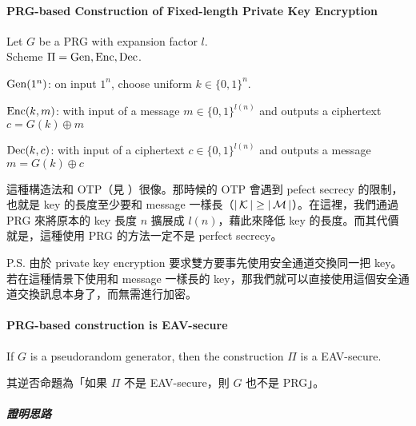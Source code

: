 \paragraph{PRG-based Construction of Fixed-length Private Key Encryption}

Let \(G\) be a PRG with expansion factor \(l\). \\
Scheme \(\Pi = \operatorname{Gen}, \operatorname{Enc}, \operatorname{Dec}\).
\begin{myItemize}
	\item \(\operatorname{Gen}(1^n)\): on input \(1^n\), choose uniform \(k \in \{0, 1\}^n\).
	\item \(\operatorname{Enc}(k, m)\): with input of a message \(m \in \{0, 1\}^{l(n)}\) and outputs a ciphertext \(c = G(k) \oplus m\)
	\item \(\operatorname{Dec}(k, c)\): with input of a ciphertext \(c \in \{0, 1\}^{l(n)}\) and outputs a message \(m = G(k) \oplus c\)
\end{myItemize}

這種構造法和 OTP（見 ）很像。那時候的 OTP 會遇到 pefect secrecy 的限制，也就是 key 的長度至少要和 message 一樣長（\(|\operatorname{\mathcal{K}}| \geq |\operatorname{\mathcal{M}}|\)）。在這裡，我們通過 PRG 來將原本的 key 長度 \(n\) 擴展成 \(l(n)\)，藉此來降低 key 的長度。而其代價就是，這種使用 PRG 的方法一定不是 perfect secrecy。

P.S. 由於 private key encryption 要求雙方要事先使用安全通道交換同一把 key。若在這種情景下使用和 message 一樣長的 key，那我們就可以直接使用這個安全通道交換訊息本身了，而無需進行加密。


\paragraph{PRG-based construction is EAV-secure}

\begin{theorem}
	If \(G\) is a pseudorandom generator, then the construction \(\Pi\) is a EAV-secure.
\end{theorem}

其逆否命題為「如果 \(\Pi\) 不是 EAV-secure，則 \(G\) 也不是 PRG」。

\subparagraph{證明思路}

